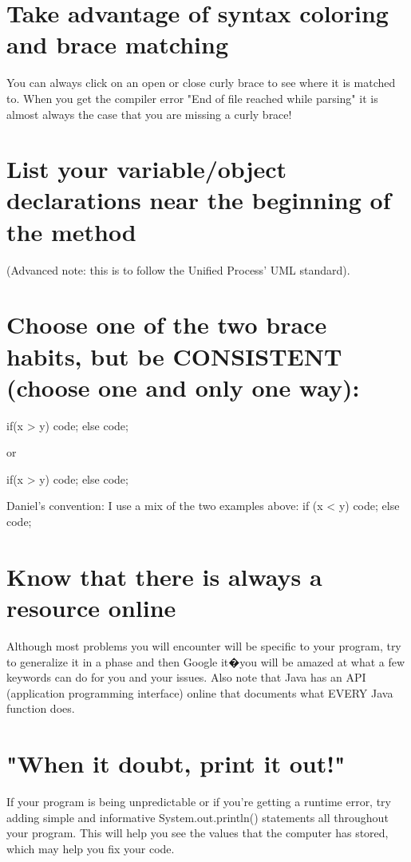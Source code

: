\documentclass[11pt,oneside]{article}
\newenvironment{articleSection}[1]
{\begin{list}{}
         {\setlength{\leftmargin}{1cm}}
         \item[]
}
{\end{list}}
\begin{document}
\section{Take advantage of syntax coloring and brace matching}
\begin{articleSection}{0.5cm}
    You can always click on an open or close curly brace to see where it is matched to. When you get the compiler error "End of file reached while parsing" it is almost always the case that you are missing a curly brace!
\end{articleSection}
    
    
\section{List your variable/object declarations near the beginning of the method }
\begin{articleSection}{0.5cm}
(Advanced note: this is to follow the Unified Process' UML standard).
\end{articleSection}


\section{Choose one of the two brace habits, but be CONSISTENT (choose one and only one way):}
\begin{articleSection}{0.5cm}
if(x > y) {
	code;
} else {
	code;
}

or 

if(x > y)
{
	code;
} 
else {
	code;
}

Daniel's convention:	I use a mix of the two examples above:
 if (x < y) {
	code;
}
else {
	code;
}
\end{articleSection}


\section{Know that there is always a resource online}
\begin{articleSection}{0.5cm}
Although most problems you will encounter will be specific to your program, try to generalize it in a phase and then Google it�you will be amazed at what a few keywords can do for you and your issues. Also note that Java has an API (application programming interface) online that documents what EVERY Java function does.
\end{articleSection}


\section{"When it doubt, print it out!"}
\begin{articleSection}{0.5cm}
If your program is being unpredictable or if you're getting a runtime error, try adding simple and informative System.out.println() statements all throughout your program. This will help you see the values that the computer has stored, which may help you fix your code.
\end{articleSection}
\end{document}
